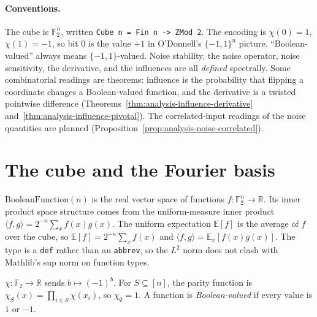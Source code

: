 \paragraph{Conventions.} The cube is $\mathbb{F}_2^n$, written
\texttt{Cube n = Fin n -> ZMod 2}. The encoding is $\chi(0) = 1$, $\chi(1) = -1$, so
bit $0$ is the value $+1$ in O'Donnell's $\{-1,1\}^n$ picture. ``Boolean-valued''
always means $\{-1,1\}$-valued. Noise stability, the noise operator, noise
sensitivity, the derivative, and the influences are all \emph{defined}
spectrally. Some combinatorial readings are theorems: influence is the
probability that flipping a coordinate changes a Boolean-valued function, and
the derivative is a twisted pointwise difference
(Theorems~\ref{thm:analysis-influence-derivative}
and~\ref{thm:analysis-influence-pivotal}). The correlated-input readings of the
noise quantities are planned (Proposition~\ref{prop:analysis-noise-correlated}).

\section{The cube and the Fourier basis}

\begin{definition}
  \label{def:analysis-cube}
  \leanok
  $\mathrm{BooleanFunction}(n)$ is the real vector space of functions
  $f : \mathbb{F}_2^n \to \mathbb{R}$. Its inner product space structure comes
  from the uniform-measure inner product
  $\langle f, g \rangle = 2^{-n} \sum_x f(x) g(x)$. The uniform expectation
  $\mathbb{E}[f]$ is the average of $f$ over the cube, so
  $\mathbb{E}[f] = 2^{-n} \sum_x f(x)$ and
  $\langle f, g \rangle = \mathbb{E}_x[f(x) g(x)]$. The type is a
  \texttt{def} rather than an \texttt{abbrev}, so the $L^2$ norm does not clash
  with Mathlib's sup norm on function types.
\end{definition}

\begin{definition}
  \label{def:analysis-parity}
  \leanok
  $\chi : \mathbb{F}_2 \to \mathbb{R}$ sends $b \mapsto (-1)^b$. For
  $S \subseteq [n]$, the parity function is
  $\chi_S(x) = \prod_{i \in S} \chi(x_i)$, so $\chi_\emptyset = 1$. A function
  is \emph{Boolean-valued} if every value is $1$ or $-1$.
\end{definition}

